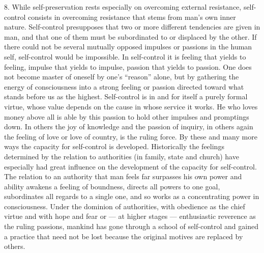\documentclass[12pt,a4paper,openany]{book}
\newcommand{\opage}[1]{\marginnote{\footnotesize\textit{[#1]}}}
\begin{document}
8. While self-preservation rests especially on overcoming external resistance, self-control consists in overcoming
resistance that stems from man's own inner nature. Self-control presupposes that two or more different tendencies
are given in man, and that one of them must be subordinated to or displaced by the other. If there could not be
several mutually opposed impulses or passions in the human self, self-control would be impossible. In self-control
it is feeling that yields to feeling, impulse that yields to impulse, passion that yields to passion. One does not
become master of oneself by one's ``reason'' alone, but by gathering the energy of consciousness into a strong
feeling or passion directed toward what stands before us as the highest. Self-control is in and for itself a purely
formal virtue, whose value depends on the cause in whose service it works. He who loves money above all is able by
this passion to hold other impulses and promptings down. In others the joy of knowledge and the passion of inquiry,
in others again the feeling of love or love of country, is the ruling force. By these and many more ways the
capacity for self-control is developed. Historically the feelings determined by the relation to authorities (in
family, state and church) have especially had great influence on the development of the capacity for self-control.
The relation to an authority that man feels far surpasses his own power and ability awakens a feeling of
boundness, directs all powers to one goal, subordinates all regards to a single one, and so works as a
concentrating power in consciousness. Under the dominion of authorities, with obedience as the chief virtue and
with hope and fear or --- at higher stages --- enthusiastic reverence as the ruling passions, mankind has gone
through a school of self-control
\opage{221}and gained a practice that need not be lost because the original motives are replaced by others.
\end{document}
